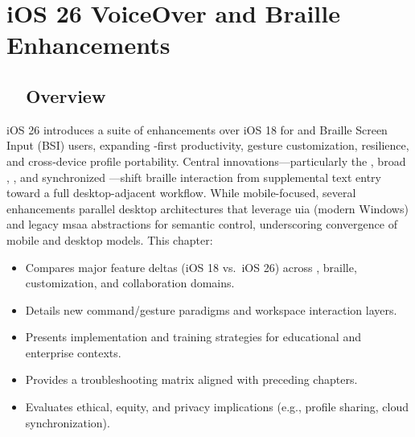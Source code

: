 \chapter{iOS 26 VoiceOver and Braille Enhancements}
\label{chap:sr30-voiceover-braille}

\section{~~Overview}
\label{sec:sr30-overview}
iOS 26 introduces a suite of enhancements over iOS 18 for  and Braille Screen Input (BSI) users, expanding -first productivity, gesture customization,  resilience, and cross‑device profile portability. Central innovations—particularly the , broad , , and synchronized —shift braille interaction from supplemental text entry toward a full desktop-adjacent workflow. While mobile-focused, several enhancements parallel desktop  architectures that leverage \gls{uia} (modern Windows) and legacy \gls{msaa} abstractions for semantic control, underscoring convergence of mobile and desktop  models. This chapter:
\begin{itemize}
	\item Compares major feature deltas (iOS 18 vs.\ iOS 26) across , braille, customization, and collaboration domains.
	\item Details new command/gesture paradigms and workspace interaction layers.
	\item Presents implementation and training strategies for educational and enterprise contexts.
	\item Provides a troubleshooting matrix aligned with preceding chapters.
	\item Evaluates ethical, equity, and privacy implications (e.g., profile sharing, cloud synchronization).
\end{itemize}

